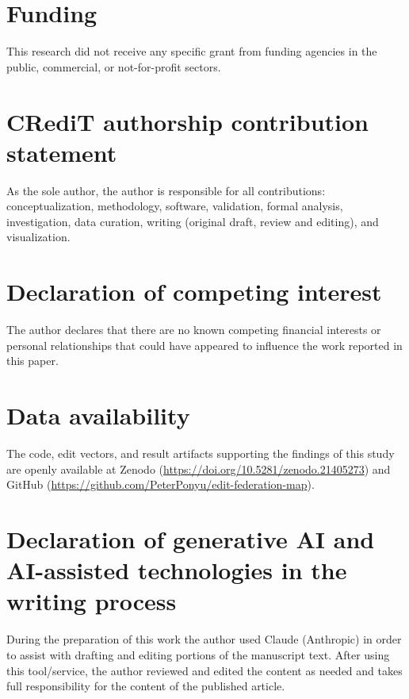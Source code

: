 \documentclass[preprint,12pt]{elsarticle}
\begin{document}
\section*{Funding}
This research did not receive any specific grant from funding agencies in the public,
commercial, or not-for-profit sectors.

\section*{CRediT authorship contribution statement}
As the sole author, the author is responsible for all contributions: conceptualization,
methodology, software, validation, formal analysis, investigation, data curation, writing
(original draft, review and editing), and visualization.

\section*{Declaration of competing interest}
The author declares that there are no known competing financial interests or personal
relationships that could have appeared to influence the work reported in this paper.

\section*{Data availability}
The code, edit vectors, and result artifacts supporting the findings of this study are
openly available at Zenodo (\url{https://doi.org/10.5281/zenodo.21405273}) and GitHub
(\url{https://github.com/PeterPonyu/edit-federation-map}).

\section*{Declaration of generative AI and AI-assisted technologies in the writing process}
During the preparation of this work the author used Claude (Anthropic) in order to
assist with drafting and editing portions of the manuscript text. After using this
tool/service, the author reviewed and edited the content as needed and takes full
responsibility for the content of the published article.



\end{document}

